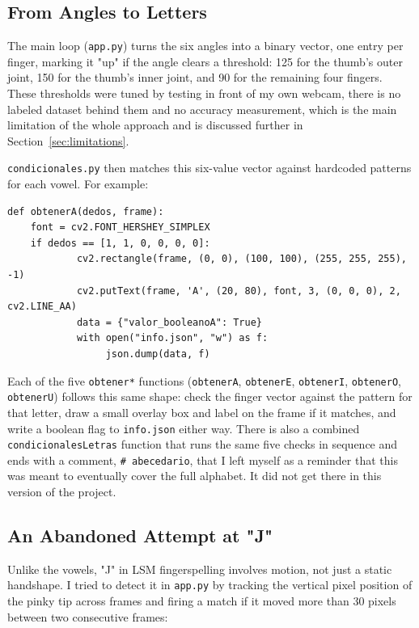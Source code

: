 \documentclass[11pt]{article}
\begin{document}
\subsection{From Angles to Letters}

The main loop (\texttt{app.py}) turns the six angles into a binary vector, one entry per finger, marking it "up" if the angle clears a threshold: 125\textdegree{} for the thumb's outer joint, 150\textdegree{} for the thumb's inner joint, and 90\textdegree{} for the remaining four fingers. These thresholds were tuned by testing in front of my own webcam, there is no labeled dataset behind them and no accuracy measurement, which is the main limitation of the whole approach and is discussed further in Section~\ref{sec:limitations}.

\texttt{condicionales.py} then matches this six-value vector against hardcoded patterns for each vowel. For example:

\begin{lstlisting}
def obtenerA(dedos, frame):
    font = cv2.FONT_HERSHEY_SIMPLEX
    if dedos == [1, 1, 0, 0, 0, 0]:
            cv2.rectangle(frame, (0, 0), (100, 100), (255, 255, 255), -1)
            cv2.putText(frame, 'A', (20, 80), font, 3, (0, 0, 0), 2, cv2.LINE_AA)
            data = {"valor_booleanoA": True}
            with open("info.json", "w") as f:
                 json.dump(data, f)
\end{lstlisting}

Each of the five \texttt{obtener*} functions (\texttt{obtenerA}, \texttt{obtenerE}, \texttt{obtenerI}, \texttt{obtenerO}, \texttt{obtenerU}) follows this same shape: check the finger vector against the pattern for that letter, draw a small overlay box and label on the frame if it matches, and write a boolean flag to \texttt{info.json} either way. There is also a combined \texttt{condicionalesLetras} function that runs the same five checks in sequence and ends with a comment, \texttt{\# abecedario}, that I left myself as a reminder that this was meant to eventually cover the full alphabet. It did not get there in this version of the project.

\subsection{An Abandoned Attempt at "J"}

Unlike the vowels, "J" in LSM fingerspelling involves motion, not just a static handshape. I tried to detect it in \texttt{app.py} by tracking the vertical pixel position of the pinky tip across frames and firing a match if it moved more than 30 pixels between two consecutive frames:
\end{document}
